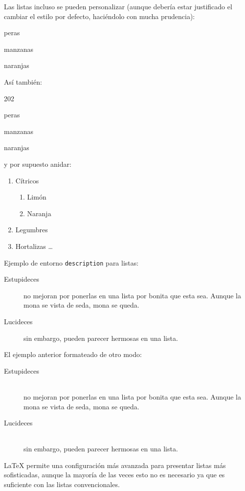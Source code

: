 \documentclass[11pt,a4paper]{article}
\begin{document}
\noindent Las listas incluso se pueden personalizar (aunque debería estar justificado el cambiar el estilo por defecto, haciéndolo con mucha prudencia):

\begin{dinglist}{52} %
	\item peras
	\item manzanas
	\item naranjas
\end{dinglist}


\noindent Así también:

\begin{dingautolist}{202} %
	\item peras
	\item manzanas
	\item naranjas
\end{dingautolist}


\noindent y por supuesto anidar:

\begin{enumerate}
  \item Cítricos
  \begin{enumerate}
    \item Limón
    \item Naranja
  \end{enumerate}
  \item Legumbres
  \item Hortalizas \ldots
\end{enumerate}


\noindent Ejemplo de entorno {\tt description} para listas:

\begin{description}
	\item[Estupideces] no mejoran por ponerlas en una lista por bonita que esta sea. Aunque la mona se vista de seda, mona se queda.
	\item[Lucideces] sin embargo, pueden parecer hermosas en
	una lista.
\end{description}

\noindent El ejemplo anterior formateado de otro modo:

\begin{description}
	\item[Estupideces]\hfill \\ 
			no mejoran por ponerlas en una lista por bonita que esta sea. Aunque la mona se vista de seda, mona se queda.
	\item[Lucideces]\hfill \\ 
			sin embargo, pueden parecer hermosas en una lista.
\end{description}

\LaTeX{} permite una configuración más avanzada para presentar listas más sofisticadas, aunque la mayoría de las veces esto no es necesario ya que es suficiente con las listas convencionales.
\end{document}
